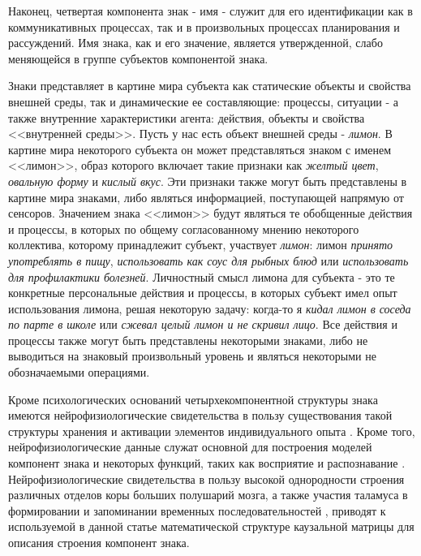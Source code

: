 \documentclass[12pt]{scrartcl}
\begin{document}
	Наконец, четвертая компонента знак - имя - служит для его идентификации как в коммуникативных процессах, так и в произвольных процессах планирования и рассуждений. Имя знака, как и его значение, является утвержденной, слабо меняющейся в группе субъектов компонентой знака.
	
	Знаки представляет в картине мира субъекта как статические объекты и свойства внешней среды, так и динамические ее составляющие: процессы, ситуации - а также внутренние характеристики агента: действия, объекты и свойства <<внутренней среды>>. Пусть у нас есть объект внешней среды - \textit{лимон}. В картине мира некоторого субъекта он может представляться знаком с именем <<лимон>>, образ которого включает такие признаки как \textit{желтый цвет}, \textit{овальную форму} и \textit{кислый вкус}. Эти признаки также могут быть представлены в картине мира знаками, либо являться информацией, поступающей напрямую от сенсоров. Значением знака <<лимон>> будут являться те обобщенные действия и процессы, в которых по общему согласованному мнению некоторого коллектива, которому принадлежит субъект, участвует \textit{лимон}: лимон \textit{принято употреблять в пищу}, \textit{использовать как соус для рыбных блюд} или \textit{использовать для профилактики болезней}. Личностный смысл лимона для субъекта - это те конкретные персональные действия и процессы, в которых субъект имел опыт использования лимона, решая некоторую задачу: когда-то я \textit{кидал лимон в соседа по парте в школе} или \textit{сжевал целый лимон и не скривил лицо}. Все действия и процессы также могут быть представлены некоторыми знаками, либо не выводиться на знаковый произвольный уровень и являться некоторыми не обозначаемыми операциями.
	
	Кроме психологических оснований четырхекомпонентной структуры знака имеются нейрофизиологические свидетельства в пользу существования такой структуры хранения и активации элементов индивидуального опыта \cite{Edelman1987,Ivanitsky1996}. Кроме того, нейрофизиологические данные служат основной для построения моделей компонент знака и некоторых функций, таких как восприятие и распознавание \cite{George2009,Panov2014d}. Нейрофизиологические свидетельства в пользу высокой однородности строения различных отделов коры больших полушарий мозга, а также участия таламуса в формировании и запоминании временных последовательностей \cite{Buxhoeveden2002,Constantinople2013}, приводят к используемой в данной статье  математической структуре каузальной матрицы \cite{Panov2015c} для описания строения компонент знака.
	
\end{document}
